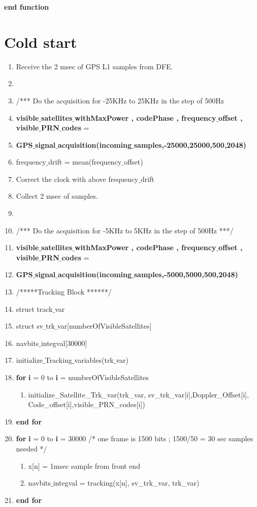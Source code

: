 \documentclass[journal,10pt,onecolumn]{article}
\begin{document}
\textbf{end function}  












\section{Cold start}
\begin{enumerate}
    \item Receive the 2 msec of GPS L1 samples from DFE.
    \item[]
    \item[] /*** Do the acquisition for -25KHz to 25KHz in the step of 500Hz
    \item \textbf{visible$\_$satellites$\_$withMaxPower , codePhase , frequency$\_$offset , visible$\_$PRN$\_$codes}  =  
    \item[] \textbf{GPS$\_$signal$\_$acquisition(incoming$\_$samples,-25000,25000,500,2048)}  
    \item frequency$\_$drift = mean(frequency$\_$offset)
    \item Correct the clock with above frequency$\_$drift
    \item Collect 2 msec of samples.
    \item []
    \item[] /*** Do the acquisition for -5KHz to 5KHz in the step of 500Hz ***/
    \item \textbf{visible$\_$satellites$\_$withMaxPower , codePhase , frequency$\_$offset , visible$\_$PRN$\_$codes}  =  
    \item[] \textbf{GPS$\_$signal$\_$acquisition(incoming$\_$samples,-5000,5000,500,2048)} 
    \item[] /*****Tracking Block ******/
    \item struct track$\_$var
    \item struct sv$\_$trk$\_$var[numberOfVisibleSatellites]
    \item navbits$\_$integval[30000]
    \item initialize$\_$Tracking$\_$variables(trk$\_$var)
    \item \textbf{for} \textbf{i} = 0 to \textbf{i} = numberOfVisibleSatellites
    \begin{enumerate}
        \item[] initialize\_Satellite\_Trk\_var(trk\_var, sv\_trk\_var[i],Doppler\_Offset[i], Code\_offset[i],visible\_PRN\_codes[i])
    \end{enumerate}
    \item[] \textbf{end for}
    \item \textbf{for} \textbf{i} = 0 to \textbf{i} = 30000 /* one frame is 1500 bits ; 1500/50 = 30 sec samples needed */
    \begin{enumerate}
        \item[] x[n] = 1msec sample from front end 
        \item[] navbits$\_$integval = tracking(x[n], sv\_trk\_var, trk\_var)
    \end{enumerate}
    \item[] \textbf{end for}
\end{enumerate}
\end{document}
